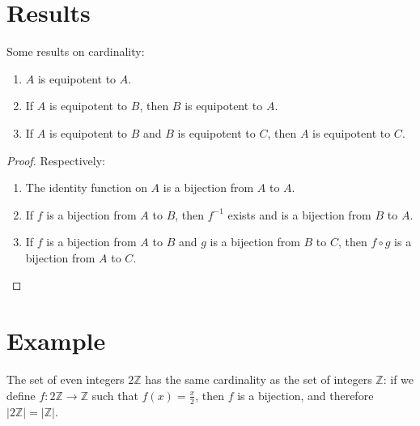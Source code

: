 \documentclass{article}
\theoremstyle{definition}
\def\Z{\mathbb{Z}}
\begin{document}
\section*{Results}

Some results on cardinality:

\begin{enumerate}

\item $A$ is equipotent to $A$.

\item If $A$ is equipotent to $B$, then $B$ is equipotent to $A$.

\item If $A$ is equipotent to $B$ and $B$ is equipotent to $C$, then $A$ is equipotent to $C$.

\end{enumerate}

\begin{proof} Respectively:

\begin{enumerate} 

\item The identity function on $A$ is a bijection from $A$ to $A$.

\item If $f$ is a bijection from $A$ to $B$, then $f^{-1}$ exists and is a bijection from $B$ to $A$.

\item If $f$ is a bijection from $A$ to $B$ and $g$ is a bijection from $B$ to $C$, then $f \circ g$ is a bijection from $A$ to $C$.

\end{enumerate}

\end{proof}

\section*{Example}

The set of even integers $2\Z$ has the same cardinality as the set of integers $\Z$: if we define $f\colon 2\Z \to \Z$ such that $f(x) = \frac{x}{2}$,
then $f$ is a bijection, and therefore $|2\Z| = |\Z|$.
\end{document}
